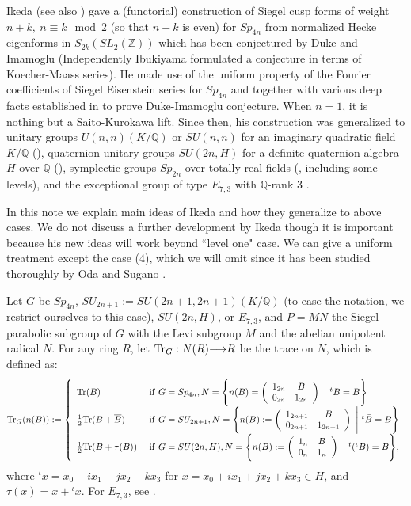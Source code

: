 \documentclass[11pt]{amsart}
\numberwithin{equation}{section}
\theoremstyle{definition}
\begin{document}
Ikeda \cite{Ik1} (see also \cite{Ik0}) gave a (functorial) construction of Siegel cusp forms of weight
$n+k,\ n\equiv
k\mod 2$  (so that $n+k$ is even)
for $Sp_{4n}$ from normalized Hecke eigenforms in $S_{2k}(SL_2({\mathbb{Z}}))$ which has been conjectured by Duke and Imamoglu
(Independently Ibukiyama formulated a conjecture in terms of Koecher-Maass series). He made use of the uniform property of the Fourier
coefficients of Siegel Eisenstein series for $Sp_{4n}$ and together with various deep facts established in \cite{Ik1}
to prove Duke-Imamoglu conjecture. When $n=1$, it is nothing but a Saito-Kurokawa lift. Since then, his construction was generalized to unitary groups $U(n,n)(K/{\mathbb{Q}})$ or $SU(n,n)$
for an imaginary quadratic field $K/{\mathbb{Q}}$ (\cite{Ik2}),
quaternion unitary groups $SU(2n,H)$ for a definite quaternion algebra $H$ over ${\mathbb{Q}}$ (\cite{Yamana}), symplectic groups $Sp_{2n}$ over totally real fields (\cite{Ik4},\cite{Ik&H}
including some levels), and the exceptional group of type $E_{7,3}$ with ${\mathbb{Q}}$-rank 3 \cite{KY}.

In this note we explain main ideas of Ikeda and how they generalize to above cases.
We do not discuss a further development by Ikeda \cite{Ik4} though it is important because his new
ideas will work beyond ``level one" case. We can give a uniform treatment except the case (4), which we will omit since it has been studied thoroughly by Oda \cite{oda} and Sugano \cite{sugano}.

Let $G$ be $Sp_{4n}$, $SU_{2n+1}:=SU(2n+1,2n+1)(K/{\mathbb{Q}})$ (to ease the notation, we restrict ourselves to this case),
$SU(2n,H)$, or $E_{7,3}$, and $P=MN$ the Siegel parabolic subgroup of $G$
with the Levi subgroup $M$ and the abelian unipotent radical $N$.
For any ring $R$, let ${{\rm Tr}}_G:N(R){\longrightarrow} R$ be the trace on $N$, which is defined as:
$${{\rm Tr}}_G(n(B)):=\left\{
\begin{array}{ll}
{{\rm Tr}}(B) &\ {\rm if}\ G=Sp_{4n}, N=\Bigg\{n(B)=\left(
\begin{array}{cc}
1_{2n} & B \\
0_{2n} & 1_{2n}
\end{array}\right) \ \Bigg|\ {}^tB=B  \Bigg\} \\
\frac{1}{2}{{\rm Tr}}(B+\overline{B}) &\ {\rm if}\ G=SU_{2n+1},
N=\Bigg\{n(B):=\left(
\begin{array}{cc}
1_{2n+1} & B \\
0_{2n+1} & 1_{2n+1}
\end{array}\right)\ \Bigg|\ {}^t {\bar B}=B  \Bigg\} \\
\frac{1}{2}{{\rm Tr}}(B+\tau(B)) &\ {\rm if}\ G=SU(2n,H),
N=\Bigg\{n(B):=\left(
\begin{array}{cc}
1_{n} & B \\
0_{n} & 1_{n}
\end{array}\right)\ \Bigg|\ {}^t ({}^\iota B)=B  \Bigg\},
\end{array}
\right.
$$
where ${}^\iota x=x_0-ix_1-jx_2-kx_3$ for $x=x_0+ix_1+jx_2+kx_3\in H$, and $\tau(x)=x+{}^\iota x$.
\newline For $E_{7,3}$, see \cite{KY}.
\end{document}
